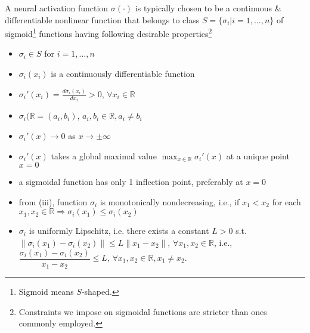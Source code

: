 \documentclass{article}
\begin{document}
\begin{enumerate}
\begin{itemize}
\begin{itemize}
			A neural activation function $\sigma(\cdot)$ is typically chosen to be a continuous \& differentiable nonlinear function that belongs to class $S = \{\sigma_i|i = 1,\ldots,n\}$ of sigmoid\footnote{Sigmoid means $S$-shaped.} functions having following desirable properties\footnote{Constraints we impose on sigmoidal functions are stricter than ones commonly employed.}
			\begin{itemize}
				\item $\sigma_i\in S$ for $i = 1,\ldots,n$
				\item $\sigma_i(x_i)$ is a continuously differentiable function
				\item $\sigma_i'(x_i) = \frac{d\sigma_i(x_i)}{dx_i} > 0$, $\forall x_i\in\mathbb{R}$
				\item $\sigma_i(\mathbb{R} = (a_i,b_i)$, $a_i,b_i\in\mathbb{R},a_i\ne b_i$
				\item $\sigma_i'(x)\to0$ as $x\to\pm\infty$
				\item $\sigma_i'(x)$ takes a global maximal value $\max_{x\in\mathbb{R}} \sigma_i'(x)$ at a unique point $x = 0$
				\item a sigmoidal function has only 1 inflection point, preferably at $x = 0$
				\item from (iii), function $\sigma_i$ is monotonically nondecreasing, i.e., if $x_1 < x_2$ for each $x_1,x_2\in\mathbb{R}\Rightarrow\sigma_i(x_1)\le\sigma_i(x_2)$
				\item $\sigma_i$ is uniformly Lipschitz, i.e. there exists a constant $L > 0$ s.t. $\|\sigma_i(x_1) - \sigma_i(x_2)\|\le L\|x_1 - x_2\|$, $\forall x_1,x_2\in\mathbb{R}$, i.e., $\dfrac{\sigma_i(x_1) - \sigma_i(x_2)}{x_1 - x_2}\le L$, $\forall x_1,x_2\in\mathbb{R},x_1\ne x_2$.
			\end{itemize}

\end{itemize}
\end{itemize}
\end{enumerate}
\end{document}
